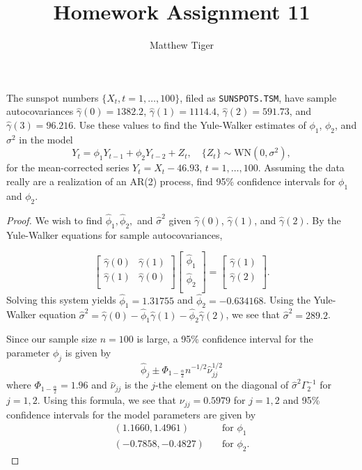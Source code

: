 \documentclass[12pt]{article}
\title{Homework Assignment 11}
\author{Matthew Tiger}
\theoremstyle{definition}
\newenvironment{custompbm}[1]
  {\renewcommand\theproblem{#1}\problem}
  {\endproblem}
\begin{document}
\maketitle


\begin{custompbm}{5.1}
  The sunspot numbers $\{X_t, t=1,\dots, 100\}$, filed as \texttt{SUNSPOTS.TSM},
  have sample autocovariances $\hat{\gamma}(0) = 1382.2$, $\hat{\gamma}(1) = 1114.4$,
  $\hat{\gamma}(2) = 591.73$, and $\hat{\gamma}(3) = 96.216$. Use these values to
  find the Yule-Walker estimates of $\phi_1$, $\phi_2$, and $\sigma^2$ in the model
  \[
    Y_t = \phi_1 Y_{t-1} + \phi_2 Y_{t-2} + Z_t, \quad \{Z_t\} \sim \text{WN}(0, \sigma^2),
  \]
  for the mean-corrected series $Y_t = X_t - 46.93$, $t=1,\dots, 100$. Assuming the
  data really are a realization of an AR(2) process, find 95\% confidence intervals
  for $\phi_1$ and $\phi_2$.
\end{custompbm}

\begin{proof}
  We wish to find $\hat{\phi}_1, \hat{\phi}_2,$ and $\hat{\sigma}^2$ given $\hat{\gamma}(0)$,
  $\hat{\gamma}(1)$, and $\hat{\gamma}(2)$. By the Yule-Walker equations for sample
  autocovariances,

  \[
    \begin{bmatrix}
      \hat{\gamma}(0) & \hat{\gamma}(1) \\
      \hat{\gamma}(1) & \hat{\gamma}(0) \\
    \end{bmatrix}
    \begin{bmatrix}
      \hat{\phi}_1 \\
      \hat{\phi}_2 \\
    \end{bmatrix}
    =
    \begin{bmatrix}
      \hat{\gamma}(1) \\
      \hat{\gamma}(2) \\
    \end{bmatrix}.
  \]
  Solving this system yields $\hat{\phi}_1 = 1.31755$ and $\hat{\phi}_2 = -0.634168$.
  Using the Yule-Walker equation $\hat{\sigma}^2 = \hat{\gamma}(0) - \hat{\phi}_1 \hat{\gamma}(1) - \hat{\phi}_2 \hat{\gamma}(2)$,
  we see that $\hat{\sigma}^2 = 289.2$.

  Since our sample size $n=100$ is large, a 95\% confidence interval for the parameter $\phi_j$ is given by
  \[
   \hat{\phi}_j \pm \Phi_{1-\frac{\alpha}{2}}n ^{-1/2} \hat{\nu}_{jj}^{1/2}
  \]
  where $\Phi_{1-\frac{\alpha}{2}} = 1.96$ and $\hat{\nu}_{jj}$ is the $j$-the element on the diagonal of
  $\hat{\sigma}^2\Gamma_2^{-1}$ for $j=1,2$. Using this formula, we see that
  $\nu_{jj} = 0.5979$ for $j=1,2$ and 95\% confidence intervals for the model
  parameters are given by
  \begin{align*}
    (1.1660, 1.4961)& \quad \text{for $\phi_1$} \\
    (-0.7858, -0.4827)& \quad \text{for $\phi_2$} .
  \end{align*}
\end{proof}
\end{document}
